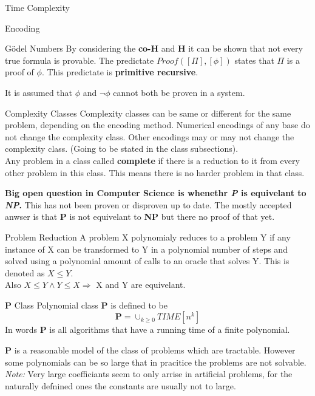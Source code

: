 \documentclass[12pt, letterpaper]{article}
\begin{document}
\begin{section}{Time Complexity}
\begin{subsection}{Encoding}
\begin{subsubsection}{Gödel Numbers}
      By considering the \textbf{co-H} and \textbf{H} it can be shown that not
      every true formula is provable. The predictate %
      \textit{\(Proof([\Pi], [\phi])\)} states that \(\Pi\) is a proof of \(\phi\).
      This predictate is \textbf{primitive recursive}.

      It is assumed that \(\phi\) and \(\lnot \phi\) cannot both be proven in a system.
    \end{subsubsection}
  \end{subsection}

  \begin{subsection}{Complexity Classes}
    Complexity classes can be same or different for the same problem, depending
    on the encoding method. Numerical encodings of any base do not change the
    complexity class. Other encodings may or may not change the complexity class.
    (Going to be stated in the class subsections). \\
    Any problem in a class called \textbf{complete} if there is a reduction
    to it from every other problem in this class. This means there is no harder
    problem in that class.

    \textbf{Big open question in Computer Science is whenethr
      \emph{P} is equivelant to \emph{NP}.} This has not been proven
    or disproven up to date. The mostly accepted anwser is that
    \textbf{P} is not equivelant to \textbf{NP} but there no
    proof of that yet.

    \begin{subsubsection}{Problem Reduction}
      A problem X polynomialy reduces to a problem Y if any instance of X can
      be transformed to Y in a polynomial number of steps and solved using
      a polynomial amount of calls to an oracle that solves Y. This is denoted as
      \(X \leq Y\). \\
      Also \(X \leq Y \land Y \leq X \Rightarrow\) X and Y are equivelant.
    \end{subsubsection}

    \begin{subsubsection}{\textbf{P} Class}
      Polynomial class \textbf{P} is defined to be
      \[\textbf{P} = \cup_{k \geq 0} TIME[n^{k}]\]
      In words \textbf{P} is all algorithms that have a running time
      of a finite polynomial.

      \textbf{P} is a reasonable model of the class of problems which are
      tractable. However some polynomials can be so large that in pracitice the
      problems are not solvable. \textit{Note:} Very large coefficiants seem to
      only arrise in artificial problems, for the naturally defnined ones the constants
      are usually not to large.


\end{subsubsection}
\end{subsection}
\end{section}
\end{document}
